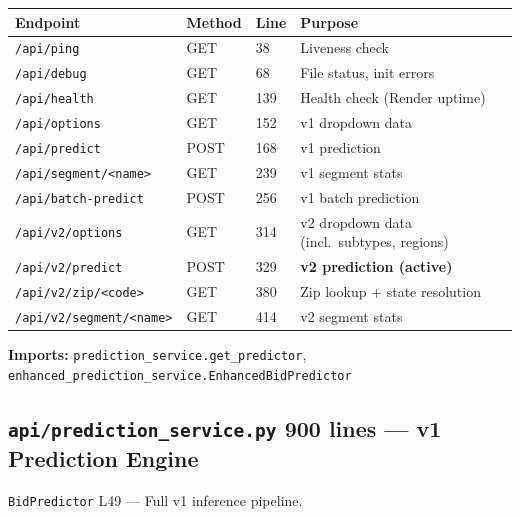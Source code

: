 \documentclass[11pt,a4paper]{article}
\newcommand{\file}[1]{\texttt{\color{gssblue!70!black}#1}}
\newcommand{\cls}[1]{\texttt{\color{uipurple}#1}}
\newcommand{\lineref}[1]{\textcolor{gssgray}{\small L#1}}
\newcommand{\apitag}[1]{\colorbox{apigreen!15}{\small\textcolor{apigreen}{\textbf{#1}}}}
\begin{document}
\begin{longtable}{l l l p{5cm}}
\toprule
\textbf{Endpoint} & \textbf{Method} & \textbf{Line} & \textbf{Purpose} \\
\midrule
\endhead
\texttt{/api/ping} & GET & 38 & Liveness check \\
\texttt{/api/debug} & GET & 68 & File status, init errors \\
\texttt{/api/health} & GET & 139 & Health check (Render uptime) \\
\texttt{/api/options} & GET & 152 & v1 dropdown data \\
\texttt{/api/predict} & POST & 168 & v1 prediction \\
\texttt{/api/segment/<name>} & GET & 239 & v1 segment stats \\
\texttt{/api/batch-predict} & POST & 256 & v1 batch prediction \\
\texttt{/api/v2/options} & GET & 314 & v2 dropdown data (incl.\ subtypes, regions) \\
\texttt{/api/v2/predict} & POST & 329 & \textbf{v2 prediction (active)} \\
\texttt{/api/v2/zip/<code>} & GET & 380 & Zip lookup + state resolution \\
\texttt{/api/v2/segment/<name>} & GET & 414 & v2 segment stats \\
\bottomrule
\end{longtable}

\textbf{Imports:} \file{prediction\_service.get\_predictor}, \file{enhanced\_prediction\_service.EnhancedBidPredictor}

\subsection{\file{api/prediction\_service.py} \apitag{900 lines} --- v1 Prediction Engine}

\cls{BidPredictor} \lineref{49} --- Full v1 inference pipeline.
\end{document}
